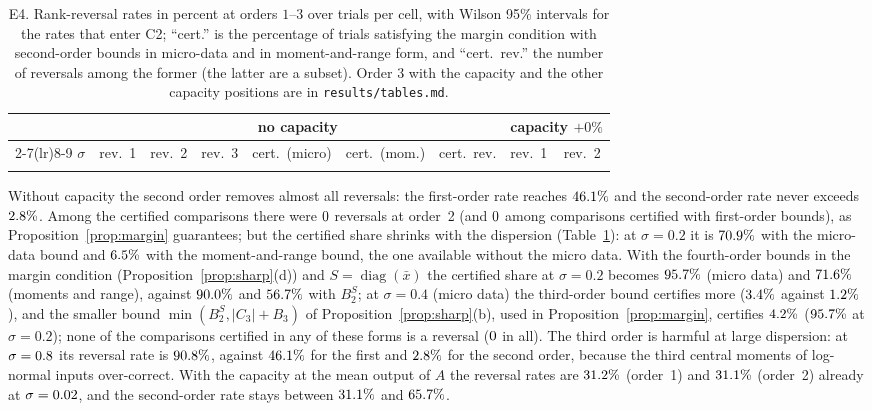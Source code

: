 \documentclass[10pt,a4paper]{article}
\theoremstyle{plain}
\theoremstyle{definition}
\theoremstyle{remark}
\begin{document}
\begin{table}[t]
\centering\scriptsize\setlength{\tabcolsep}{2.5pt}
\begin{tabular}{rlllrrrll}
\toprule
& \multicolumn{6}{c}{no capacity} & \multicolumn{2}{c}{capacity $+0\%$}\\
\cmidrule(lr){2-7}\cmidrule(lr){8-9}
$\sigma$ & rev.~1 & rev.~2 & rev.~3 & cert.\ (micro) & cert.\ (mom.) & cert.\ rev. & rev.~1 & rev.~2\\
\midrule
\\
\bottomrule
\end{tabular}
\caption{E4. Rank-reversal rates in percent at orders $1$--$3$ over \EfourTrials{} trials per cell, with Wilson 95\% intervals for the rates that enter C2; ``cert.'' is the percentage of trials satisfying the margin condition with second-order bounds in micro-data and in moment-and-range form, and ``cert.\ rev.'' the number of reversals among the former (the latter are a subset). Order 3 with the capacity and the other capacity positions are in \texttt{results/tables.md}.}
\label{tab:e4}
\end{table}

Without capacity the second order removes almost all reversals: the first-order rate reaches $46.1\%$ and the second-order rate never exceeds $2.8\%$. Among the certified comparisons there were $0$ reversals at order~2 (and $0$ among comparisons certified with first-order bounds), as Proposition~\ref{prop:margin} guarantees; but the certified share shrinks with the dispersion (Table~\ref{tab:e4}): at $\sigma=0.2$ it is $70.9\%$ with the micro-data bound and $6.5\%$ with the moment-and-range bound, the one available without the micro data. With the fourth-order bounds in the margin condition (Proposition~\ref{prop:sharp}(d)) and $S=\operatorname{diag}(\bar x)$ the certified share at $\sigma=0.2$ becomes $95.7\%$ (micro data) and $71.6\%$ (moments and range), against $90.0\%$ and $56.7\%$ with $B_2^S$; at $\sigma=0.4$ (micro data) the third-order bound certifies more ($3.4\%$ against $1.2\%$), and the smaller bound $\min(B_2^S,|C_3|+B_3)$ of Proposition~\ref{prop:sharp}(b), used in Proposition~\ref{prop:margin}, certifies $4.2\%$ ($95.7\%$ at $\sigma=0.2$); none of the comparisons certified in any of these forms is a reversal ($0$ in all). The third order is harmful at large dispersion: at $\sigma=0.8$ its reversal rate is $90.8\%$, against $46.1\%$ for the first and $2.8\%$ for the second order, because the third central moments of log-normal inputs over-correct. With the capacity at the mean output of $A$ the reversal rates are $31.2\%$ (order~1) and $31.1\%$ (order~2) already at $\sigma=0.02$, and the second-order rate stays between $31.1\%$ and $65.7\%$.
\end{document}
